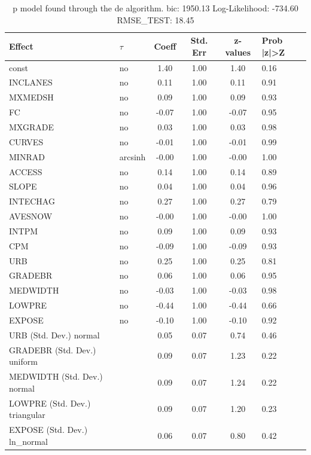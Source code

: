 \begin{table}
	\caption{p model found through the de algorithm. bic: 1950.13 Log-Likelihood: -734.60 RMSE_TEST: 18.45}
	\begin{center}
		\begin{tabular}{|l|l|c|c|c|l|}
			\hline
			Effect & $\tau$ & Coeff & Std. Err & z-values & Prob |z|>Z \\
			\hline
			const & no & 1.40 & 1.00 & 1.40 & 0.16 \\
			\hline
			INCLANES & no & 0.11 & 1.00 & 0.11 & 0.91 \\
			\hline
			MXMEDSH & no & 0.09 & 1.00 & 0.09 & 0.93 \\
			\hline
			FC & no & -0.07 & 1.00 & -0.07 & 0.95 \\
			\hline
			MXGRADE & no & 0.03 & 1.00 & 0.03 & 0.98 \\
			\hline
			CURVES & no & -0.01 & 1.00 & -0.01 & 0.99 \\
			\hline
			MINRAD & arcsinh & -0.00 & 1.00 & -0.00 & 1.00 \\
			\hline
			ACCESS & no & 0.14 & 1.00 & 0.14 & 0.89 \\
			\hline
			SLOPE & no & 0.04 & 1.00 & 0.04 & 0.96 \\
			\hline
			INTECHAG & no & 0.27 & 1.00 & 0.27 & 0.79 \\
			\hline
			AVESNOW & no & -0.00 & 1.00 & -0.00 & 1.00 \\
			\hline
			INTPM & no & 0.09 & 1.00 & 0.09 & 0.93 \\
			\hline
			CPM & no & -0.09 & 1.00 & -0.09 & 0.93 \\
			\hline
			URB & no & 0.25 & 1.00 & 0.25 & 0.81 \\
			\hline
			GRADEBR & no & 0.06 & 1.00 & 0.06 & 0.95 \\
			\hline
			MEDWIDTH & no & -0.03 & 1.00 & -0.03 & 0.98 \\
			\hline
			LOWPRE & no & -0.44 & 1.00 & -0.44 & 0.66 \\
			\hline
			EXPOSE & no & -0.10 & 1.00 & -0.10 & 0.92 \\
			\hline
			URB (Std. Dev.) normal &  & 0.05 & 0.07 & 0.74 & 0.46 \\
			\hline
			GRADEBR (Std. Dev.) uniform &  & 0.09 & 0.07 & 1.23 & 0.22 \\
			\hline
			MEDWIDTH (Std. Dev.) normal &  & 0.09 & 0.07 & 1.24 & 0.22 \\
			\hline
			LOWPRE (Std. Dev.) triangular &  & 0.09 & 0.07 & 1.20 & 0.23 \\
			\hline
			EXPOSE (Std. Dev.) ln_normal &  & 0.06 & 0.07 & 0.80 & 0.42 \\
			\hline
		\end{tabular}
	\end{center}
\end{table}